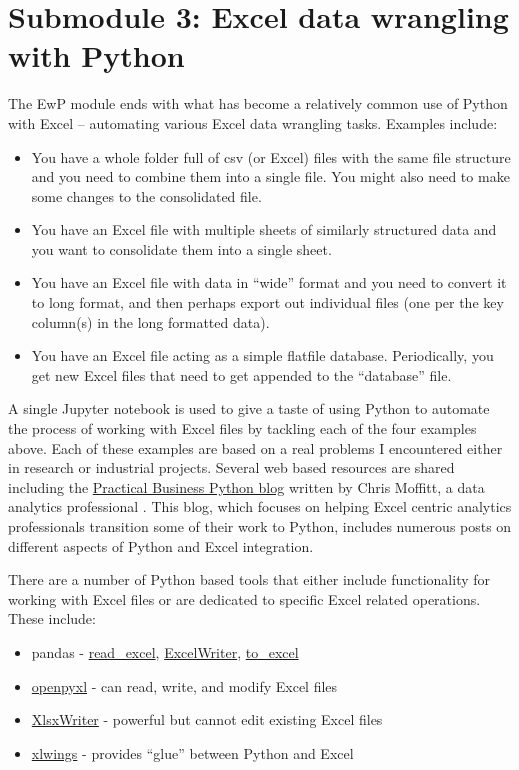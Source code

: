 \documentclass[ited,blindrev]{informs3}              %
\begin{document}
\section{Submodule 3: Excel data wrangling with Python}

The EwP module ends with what has become a relatively common use of Python with Excel -- automating various Excel data wrangling tasks. Examples include:

\begin{itemize}
	\item
	You have a whole folder full of csv (or Excel) files with the same
	file structure and you need to combine them into a single file. You
	might also need to make some changes to the consolidated file.
	\item
	You have an Excel file with multiple sheets of similarly structured
	data and you want to consolidate them into a single sheet.
	\item
	You have an Excel file with data in ``wide'' format and you need to
	convert it to long format, and then perhaps export out individual
	files (one per the key column(s) in the long formatted data).
	\item
	You have an Excel file acting as a simple flatfile database.
	Periodically, you get new Excel files that need to get appended to the
	``database'' file.
\end{itemize}

A single Jupyter notebook is used to give a taste of using Python to automate the process of working with Excel files by tackling each of the four examples above. Each of these examples are based on a real problems I encountered either in research or industrial projects. Several web based resources are shared including the \href{https://pbpython.com/}{Practical Business Python blog} written by Chris Moffitt, a data analytics professional \cite{moffittPracticalBusinessPython}. This blog, which focuses on helping Excel centric analytics professionals transition some of their work to Python, includes numerous posts on different aspects of Python and Excel integration.  

There are a number of Python based tools that either include functionality for working with Excel files or are dedicated to specific Excel related operations. These include:

\begin{itemize}
	\item
	pandas -
	\href{https://pandas.pydata.org/docs/reference/api/pandas.read_excel.html}{read\_excel},
	\href{https://pandas.pydata.org/docs/reference/api/pandas.ExcelWriter.html}{ExcelWriter},
	\href{https://pandas.pydata.org/docs/reference/api/pandas.DataFrame.to_excel.html}{to\_excel}
	\item
	\href{https://openpyxl.readthedocs.io/en/stable/}{openpyxl} - can
	read, write, and modify Excel files
	\item
	\href{https://xlsxwriter.readthedocs.io/}{XlsxWriter} - powerful but
	cannot edit existing Excel files
	\item
	\href{https://www.xlwings.org/}{xlwings} - provides ``glue'' between
	Python and Excel
\end{itemize}
\end{document}
